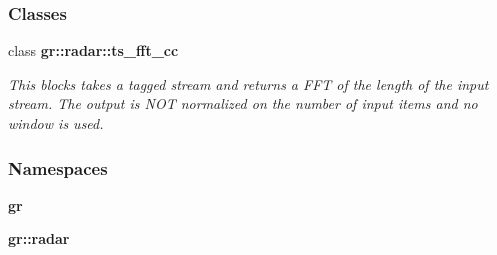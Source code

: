 \subsubsection*{Classes}
\begin{DoxyCompactItemize}
\item 
class {\bf gr\+::radar\+::ts\+\_\+fft\+\_\+cc}
\begin{DoxyCompactList}\small\item\em This blocks takes a tagged stream and returns a F\+FT of the length of the input stream. The output is N\+OT normalized on the number of input items and no window is used. \end{DoxyCompactList}\end{DoxyCompactItemize}
\subsubsection*{Namespaces}
\begin{DoxyCompactItemize}
\item 
 {\bf gr}
\item 
 {\bf gr\+::radar}
\end{DoxyCompactItemize}
